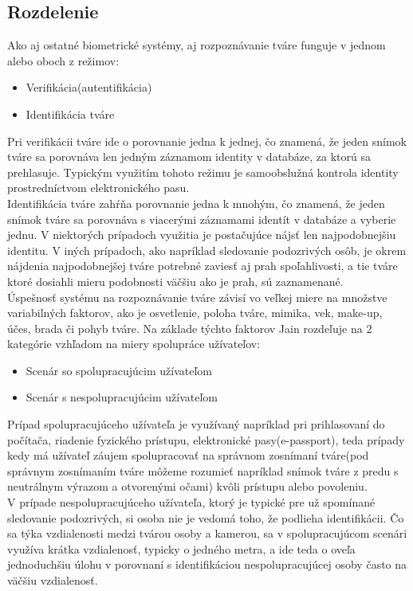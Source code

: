 \subsection{Rozdelenie}
Ako aj ostatné biometrické systémy, aj rozpoznávanie tváre funguje v jednom alebo oboch z režimov:

\begin{itemize}
	\item Verifikácia(autentifikácia)
	\item Identifikácia tváre
\end{itemize}

Pri verifikácii tváre ide o porovnanie jedna k jednej, čo znamená, že jeden snímok tváre sa porovnáva len jedným záznamom identity v databáze, za ktorú sa prehlasuje.
Typickým využitím tohoto režimu je samoobslužná kontrola identity prostredníctvom elektronického pasu\cite{handbookface}.\\
\indent Identifikácia tváre zahŕňa porovnanie jedna k mnohým, čo znamená, že jeden snímok tváre sa porovnáva s viacerými záznamami identít v databáze a vyberie jednu\cite{handbookface}.
V niektorých prípadoch využitia je postačujúce nájsť len najpodobnejšiu identitu.
V iných prípadoch, ako napríklad sledovanie podozrivých osôb,
je okrem nájdenia najpodobnejšej tváre potrebné zaviesť aj prah spoľahlivosti, a tie tváre ktoré dosiahli mieru podobnosti väčšiu ako je prah, sú zaznamenané.\\
\indent Úspešnosť systému na rozpoznávanie tváre závisí vo veľkej miere na množstve variabilných faktorov, ako je osvetlenie, poloha tváre, mimika, vek, make-up, účes,
brada či pohyb tváre. Na základe týchto faktorov Jain rozdeľuje\cite{handbookface} na 2 kategórie vzhľadom na miery spolupráce užívateľov:

\begin{itemize}
	\item Scenár so spolupracujúcim užívateľom
	\item Scenár s nespolupracujúcim užívateľom
\end{itemize}

\indent Prípad spolupracujúceho užívateľa je využívaný napríklad pri prihlasovaní do počítača, riadenie fyzického prístupu, elektronické pasy(e-passport), teda prípady kedy má
užívateľ záujem spolupracovať na správnom zosnímaní tváre(pod správnym zosnímaním tváre môžeme rozumieť napríklad snímok tváre z predu s neutrálnym výrazom a otvorenými očami)
kvôli prístupu alebo povoleniu.\\
\indent V prípade nespolupracujúceho užívateľa, ktorý je typické pre už spomínané sledovanie podozrivých, si osoba nie je vedomá toho, že podlieha identifikácii.
Čo sa týka vzdialenosti
medzi tvárou osoby a kamerou, sa v spolupracujúcom scenári využíva krátka vzdialenosť, typicky o jedného metra, a ide teda o oveľa jednoduchšiu úlohu v porovnaní s identifikáciou
nespolupracujúcej osoby často na väčšiu vzdialenosť.


